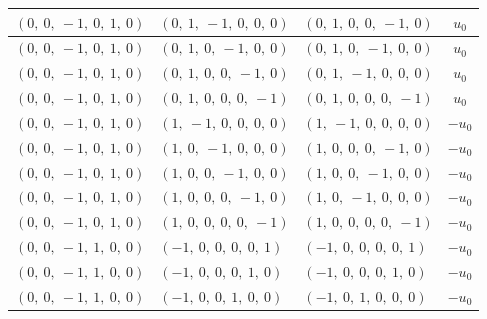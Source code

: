 \documentclass[11pt]{article}
\theoremstyle{definition}
\begin{document}
\begin{longtable}{|l|l|l|c|}
    \hline
    $\left( 0, \  0, \  -1, \  0, \  1, \  0\right)$ & $\left( 0, \  1, \  -1, \  0, \  0, \  0\right)$ & $\left( 0, \  1, \  0, \  0, \  -1, \  0\right)$ & $u_{0}$ \\
    \hline
    $\left( 0, \  0, \  -1, \  0, \  1, \  0\right)$ & $\left( 0, \  1, \  0, \  -1, \  0, \  0\right)$ & $\left( 0, \  1, \  0, \  -1, \  0, \  0\right)$ & $u_{0}$ \\
    \hline
    $\left( 0, \  0, \  -1, \  0, \  1, \  0\right)$ & $\left( 0, \  1, \  0, \  0, \  -1, \  0\right)$ & $\left( 0, \  1, \  -1, \  0, \  0, \  0\right)$ & $u_{0}$ \\
    \hline
    $\left( 0, \  0, \  -1, \  0, \  1, \  0\right)$ & $\left( 0, \  1, \  0, \  0, \  0, \  -1\right)$ & $\left( 0, \  1, \  0, \  0, \  0, \  -1\right)$ & $u_{0}$ \\
    \hline
    $\left( 0, \  0, \  -1, \  0, \  1, \  0\right)$ & $\left( 1, \  -1, \  0, \  0, \  0, \  0\right)$ & $\left( 1, \  -1, \  0, \  0, \  0, \  0\right)$ & $- u_{0}$ \\
    \hline
    $\left( 0, \  0, \  -1, \  0, \  1, \  0\right)$ & $\left( 1, \  0, \  -1, \  0, \  0, \  0\right)$ & $\left( 1, \  0, \  0, \  0, \  -1, \  0\right)$ & $- u_{0}$ \\
    \hline
    $\left( 0, \  0, \  -1, \  0, \  1, \  0\right)$ & $\left( 1, \  0, \  0, \  -1, \  0, \  0\right)$ & $\left( 1, \  0, \  0, \  -1, \  0, \  0\right)$ & $- u_{0}$ \\
    \hline
    $\left( 0, \  0, \  -1, \  0, \  1, \  0\right)$ & $\left( 1, \  0, \  0, \  0, \  -1, \  0\right)$ & $\left( 1, \  0, \  -1, \  0, \  0, \  0\right)$ & $- u_{0}$ \\
    \hline
    $\left( 0, \  0, \  -1, \  0, \  1, \  0\right)$ & $\left( 1, \  0, \  0, \  0, \  0, \  -1\right)$ & $\left( 1, \  0, \  0, \  0, \  0, \  -1\right)$ & $- u_{0}$ \\
    \hline
    $\left( 0, \  0, \  -1, \  1, \  0, \  0\right)$ & $\left( -1, \  0, \  0, \  0, \  0, \  1\right)$ & $\left( -1, \  0, \  0, \  0, \  0, \  1\right)$ & $- u_{0}$ \\
    \hline
    $\left( 0, \  0, \  -1, \  1, \  0, \  0\right)$ & $\left( -1, \  0, \  0, \  0, \  1, \  0\right)$ & $\left( -1, \  0, \  0, \  0, \  1, \  0\right)$ & $- u_{0}$ \\
    \hline
    $\left( 0, \  0, \  -1, \  1, \  0, \  0\right)$ & $\left( -1, \  0, \  0, \  1, \  0, \  0\right)$ & $\left( -1, \  0, \  1, \  0, \  0, \  0\right)$ & $- u_{0}$ \\

\end{longtable}
\end{document}
